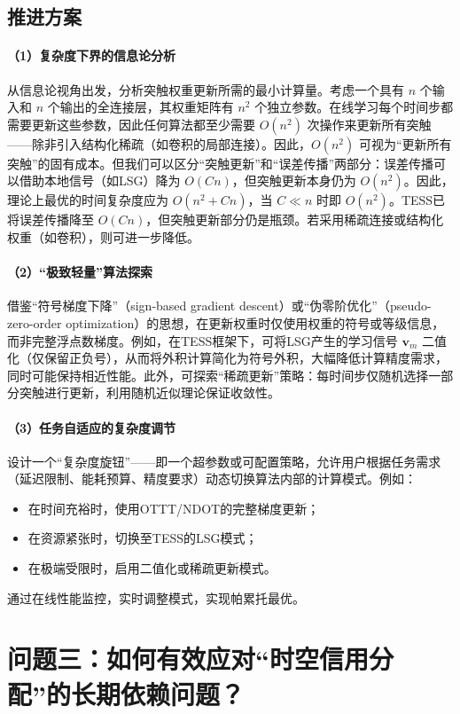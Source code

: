 \documentclass{article}
\begin{document}
\subsection{推进方案}

\paragraph{（1）复杂度下界的信息论分析}
从信息论视角出发，分析突触权重更新所需的最小计算量。考虑一个具有 \(n\) 个输入和 \(n\) 个输出的全连接层，其权重矩阵有 \(n^2\) 个独立参数。在线学习每个时间步都需要更新这些参数，因此任何算法都至少需要 \(O(n^2)\) 次操作来更新所有突触——除非引入结构化稀疏（如卷积的局部连接）。因此，\(O(n^2)\) 可视为“更新所有突触”的固有成本。但我们可以区分“突触更新”和“误差传播”两部分：误差传播可以借助本地信号（如LSG）降为 \(O(Cn)\)，但突触更新本身仍为 \(O(n^2)\)。因此，理论上最优的时间复杂度应为 \(O(n^2 + Cn)\)，当 \(C \ll n\) 时即 \(O(n^2)\)。TESS已将误差传播降至 \(O(Cn)\)，但突触更新部分仍是瓶颈。若采用稀疏连接或结构化权重（如卷积），则可进一步降低。

\paragraph{（2）“极致轻量”算法探索}
借鉴“符号梯度下降”（sign-based gradient descent）或“伪零阶优化”（pseudo-zero-order optimization）的思想，在更新权重时仅使用权重的符号或等级信息，而非完整浮点数梯度。例如，在TESS框架下，可将LSG产生的学习信号 \(\mathbf{v}_m\) 二值化（仅保留正负号），从而将外积计算简化为符号外积，大幅降低计算精度需求，同时可能保持相近性能。此外，可探索“稀疏更新”策略：每时间步仅随机选择一部分突触进行更新，利用随机近似理论保证收敛性。

\paragraph{（3）任务自适应的复杂度调节}
设计一个“复杂度旋钮”——即一个超参数或可配置策略，允许用户根据任务需求（延迟限制、能耗预算、精度要求）动态切换算法内部的计算模式。例如：
\begin{itemize}
    \item 在时间充裕时，使用OTTT/NDOT的完整梯度更新；
    \item 在资源紧张时，切换至TESS的LSG模式；
    \item 在极端受限时，启用二值化或稀疏更新模式。
\end{itemize}
通过在线性能监控，实时调整模式，实现帕累托最优。

\section{问题三：如何有效应对“时空信用分配”的长期依赖问题？}
\end{document}
